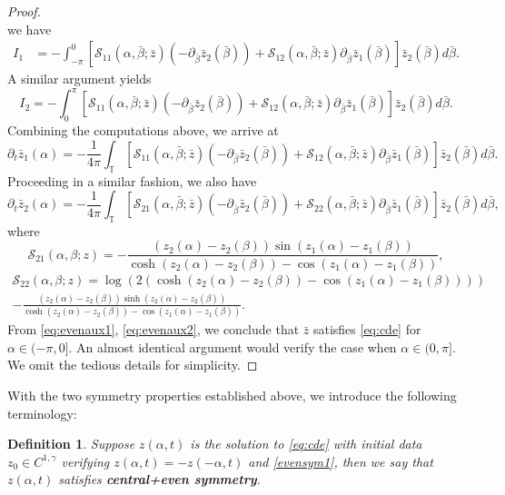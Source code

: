 \documentclass[11pt]{article}
\numberwithin{equation}{section}
\newtheorem{defn}[thm]{Definition}
\newcommand{\T}{\mathbb{T}}
\newcommand{\calS}{\mathcal{S}}
\newcommand{\p}{\partial}
\begin{document}
\begin{proof}
$$    $$
    we have
    \begin{align*}
        I_1 &= -\int_{-\pi}^0 \left[ \calS_{11}(\alpha,\bar\beta;\bar{z})(-\p_{\bar\beta}\bar{z}_2(\bar\beta)) + \calS_{12}(\alpha,\bar\beta;\bar{z})\p_{\bar\beta}\bar{z}_1(\bar\beta) \right] \bar{z}_2(\bar\beta) d\bar\beta.
    \end{align*}
    A similar argument yields
    $$
    I_2 = -\int_0^\pi \left[ \calS_{11}(\alpha,\bar\beta;\bar{z})(-\p_{\bar\beta}\bar{z}_2(\bar\beta)) + \calS_{12}(\alpha,\bar\beta;\bar{z})\p_{\bar\beta}\bar{z}_1(\bar\beta) \right] \bar{z}_2(\bar\beta) d\bar\beta.
    $$
    Combining the computations above, we arrive at
    \begin{equation}\label{eq:evenaux1}
    \p_t\bar{z}_1(\alpha) = -\frac{1}{4\pi}\int_\T \left[ \calS_{11}(\alpha,\bar\beta;\bar{z})(-\p_{\bar\beta}\bar{z}_2(\bar\beta)) + \calS_{12}(\alpha,\bar\beta;\bar{z})\p_{\bar\beta}\bar{z}_1(\bar\beta) \right] \bar{z}_2(\bar\beta) d\bar\beta.
    \end{equation}
    Proceeding in a similar fashion, we also have
    \begin{equation}\label{eq:evenaux2}
    \p_t \bar{z}_2(\alpha) = -\frac{1}{4\pi}\int_\T \left[ \calS_{21}(\alpha,\bar\beta;\bar{z})(-\p_{\bar\beta}\bar{z}_2(\bar\beta)) + \calS_{22}(\alpha,\bar\beta;\bar{z})\p_{\bar\beta}\bar{z}_1(\bar\beta) \right] \bar{z}_2(\bar\beta) d\bar\beta,
    \end{equation}
    where
    $$
    \calS_{21}(\alpha,\beta;z) = - \frac{(z_2(\alpha)-z_2(\beta))\sin(z_1(\alpha) - z_1(\beta))}{\cosh(z_2(\alpha) - z_2(\beta)) - \cos(z_1(\alpha) - z_1(\beta))},
    $$
    \begin{align*}
    \calS_{22}(\alpha,\beta;z) = \log\left(2(\cosh(z_2(\alpha) - z_2(\beta))- \cos(z_1(\alpha) - z_1(\beta)))\right)\\
    - \frac{(z_2(\alpha) - z_2(\beta))\sinh(z_2(\alpha) - z_2(\beta))}{\cosh(z_2(\alpha) - z_2(\beta)) - \cos(z_1(\alpha) - z_1(\beta))}.
    \end{align*}
    From \eqref{eq:evenaux1}, \eqref{eq:evenaux2}, we conclude that $\bar{z}$ satisfies \eqref{eq:cde} for $\alpha \in (-\pi,0]$. An almost identical argument would verify the case when $\alpha \in (0,\pi]$. We omit the tedious details for simplicity.
\end{proof}

With the two symmetry properties established above, we introduce the following terminology:
\begin{defn}\label{defn:odd+even}
    Suppose $z(\alpha,t)$ is the solution to \eqref{eq:cde} with initial data $z_0 \in C^{1,\gamma}$ verifying $z(\alpha,t) = -z(-\alpha,t)$ and \eqref{evensym1}, then we say that $z(\alpha,t)$ satisfies \textbf{central+even symmetry}.
\end{defn}
\end{document}

